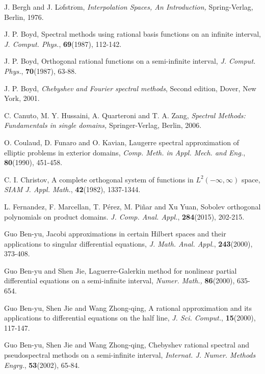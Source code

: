 \documentclass[10pt,reqno]{amsart}
\theoremstyle{remark}
\theoremstyle{definition}
\begin{document}
\begin{thebibliography}{99}

  J. Bergh and J. L${\ddot o}$fstr${\ddot o}$m,
{\it Interpolation Spaces, An Introduction,} Spring-Verlag, Berlin,
1976.

J. P. Boyd,
 Spectral methods using rational basis functions on an  infinite
  interval, {\it J. Comput. Phys.}, {\bf 69}(1987), 112-142.

J. P. Boyd, Orthogonal rational functions on a semi-infinite interval, {\it J. Comput. Phys.}, {\bf 70}(1987), 63-88.

 J. P. Boyd, {\it Chebyshev and Fourier spectral methods}, Second
edition, Dover, New York, 2001.

 C. Canuto, M. Y. Hussaini, A. Quarteroni and T. A. Zang, {\it Spectral Methods:
Fundamentals in single domains,} Springer-Verlag, Berlin, 2006.

 O. Coulaud, D. Funaro and O. Kavian,
Laugerre spectral approximation of elliptic problems in exterior
domains, {\it Comp. Meth. in Appl. Mech. and Eng.}, {\bf 80}(1990),
451-458.

C. I. Christov,
 A complete orthogonal system of functions in $L^2(-\infty, \infty)$
  space,
{\it SIAM J. Appl. Math.}, {\bf 42}(1982), 1337-1344.

 L. Fernandez, F. Marcellan, T. P\'{e}rez, M. Pi\~{n}ar and Xu Yuan,  Sobolev orthogonal polynomials on product domains. {\it J. Comp. Anal. Appl.}, {\bf 284}(2015), 202-215.

  Guo Ben-yu, Jacobi approximations in certain Hilbert spaces and their applications to singular differential equations, {\it J. Math. Anal. Appl.}, {\bf 243}(2000), 373-408.

 Guo Ben-yu and Shen Jie, Laguerre-Galerkin method for nonlinear partial differential equations on a semi-infinite interval, {\it Numer. Math.,} {\bf 86}(2000),
635-654.

 Guo Ben-yu, Shen Jie and Wang Zhong-qing, A rational approximation and its applications to differential equations on the half line, {\it J. Sci. Comput.}, {\bf 15}(2000), 117-147.

 Guo Ben-yu, Shen Jie and Wang Zhong-qing, Chebyshev rational spectral and pseudospectral methods on a semi-infinite interval, {\it Internat. J. Numer. Methods Engrg.}, {\bf 53}(2002), 65-84.


\end{thebibliography}
\end{document}
